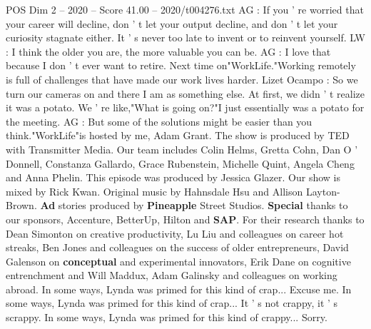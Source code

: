 \begin{textsample}{POS Dim 2 – 2020 – Score 41.00 – 2020/t004276.txt}
AG : If you ' re worried that your career will decline, don ' t let your output decline, and don ' t let your curiosity stagnate either.
It ' s never too late to invent or to reinvent yourself.
LW : I think the older you are, the more valuable you can be.
AG : I love that because I don ' t ever want to retire.
Next time on"WorkLife."Working remotely is full of challenges that have made our work lives harder.
Lizet Ocampo : So we turn our cameras on and there I am as something else.
At first, we didn ' t realize it was a potato.
We ' re like,"What is going on?"I just essentially was a potato for the meeting.
AG : But some of the solutions might be easier than you think."WorkLife"is hosted by me, Adam Grant.
The show is produced by TED with Transmitter Media.
Our team includes Colin Helms, Gretta Cohn, Dan O ' Donnell, Constanza Gallardo, Grace Rubenstein, Michelle Quint, Angela Cheng and Anna Phelin.
This episode was produced by Jessica Glazer.
Our show is mixed by Rick Kwan.
Original music by Hahnsdale Hsu and Allison Layton-Brown. \textbf{Ad} stories produced by \textbf{Pineapple} Street Studios. \textbf{Special} thanks to our sponsors, Accenture, BetterUp, Hilton and \textbf{SAP}.
For their research thanks to Dean Simonton on creative productivity, Lu Liu and colleagues on career hot streaks, Ben Jones and colleagues on the success of older entrepreneurs, David Galenson on \textbf{conceptual} and experimental innovators, Erik Dane on cognitive entrenchment and Will Maddux, Adam Galinsky and colleagues on working abroad.
In some ways, Lynda was primed for this kind of crap...
Excuse me.
In some ways, Lynda was primed for this kind of crap...
It ' s not crappy, it ' s scrappy.
In some ways, Lynda was primed for this kind of crappy...
Sorry.

\end{textsample}
